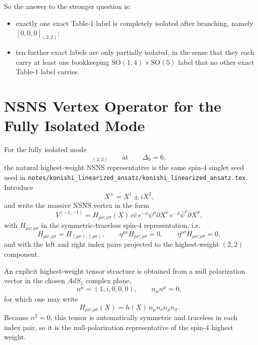 \documentclass[12pt]{article}
\newcommand{\SO}{\mathrm{SO}}
\newcommand{\D}{\Delta}
\begin{document}
So the answer to the stronger question is:
\begin{itemize}
\item exactly one exact Table-1 label is completely isolated after branching,
namely $[0,0,0]_{(2,2)}$;
\item ten further exact labels are only partially isolated, in the sense that they each carry
at least one bookkeeping $\SO(1,4)\times \SO(5)$ label that no other exact Table-1 label carries.
\end{itemize}

\section{NSNS Vertex Operator for the Fully Isolated Mode}

For the fully isolated mode
\begin{equation}
[0,0,0]_{(2,2)}\qquad \text{at}\qquad \D_0=6,
\end{equation}
the natural highest-weight NSNS representative is the same spin-4 singlet seed used in
\texttt{notes/konishi\_linearized\_ansatz/konishi\_linearized\_ansatz.tex}.
Introduce
\begin{equation}
X^\pm=X^1\pm iX^2,
\end{equation}
and write the massive NSNS vertex in the form
\begin{equation}
V^{(-1,-1)}=
H_{\mu\nu;\rho\sigma}(X)\,
c\bar c\,
e^{-\phi}\psi^\mu\partial X^\nu\,
e^{-\bar\phi}\bar\psi^\rho\bar\partial X^\sigma,
\end{equation}
with $H_{\mu\nu;\rho\sigma}$ in the symmetric-traceless spin-4 representation, i.e.
\begin{equation}
H_{\mu\nu;\rho\sigma}
=H_{(\mu\nu);(\rho\sigma)},\qquad
\eta^{\mu\nu}H_{\mu\nu;\rho\sigma}=0,\qquad
\eta^{\rho\sigma}H_{\mu\nu;\rho\sigma}=0,
\end{equation}
and with the left and right index pairs projected to the highest-weight $(2,2)$ component.

An explicit highest-weight tensor structure is obtained from a null polarization vector in the chosen
$AdS_5$ complex plane,
\begin{equation}
n^\mu=(1,i,0,0,0),\qquad n_\mu n^\mu=0,
\end{equation}
for which one may write
\begin{equation}
H_{\mu\nu;\rho\sigma}(X)=h(X)\,n_\mu n_\nu n_\rho n_\sigma.
\end{equation}
Because $n^2=0$, this tensor is automatically symmetric and traceless in each index pair, so it is
the null-polarization representative of the spin-4 highest weight.
\end{document}

